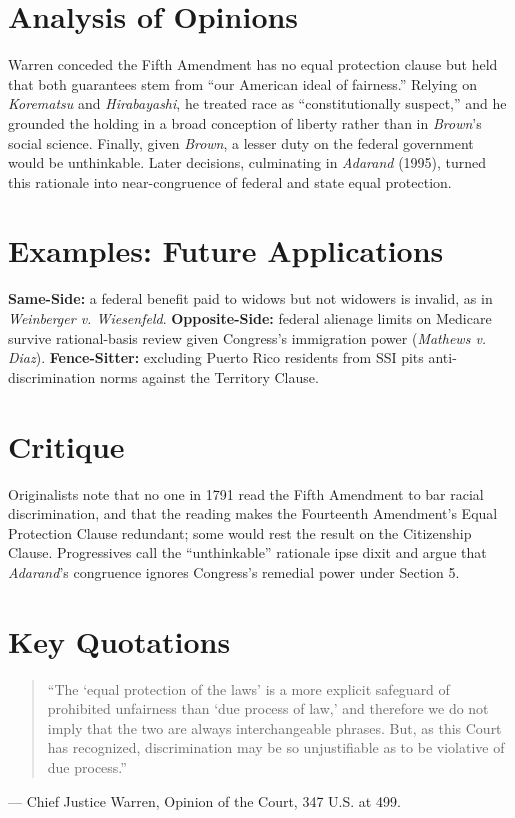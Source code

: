 \documentclass[12pt]{article}
\begin{document}
\section{Analysis of Opinions}
Warren conceded the Fifth Amendment has no equal protection clause but held that both guarantees stem from ``our American ideal of fairness.'' Relying on \textit{Korematsu} and \textit{Hi\-ra\-ba\-ya\-shi}, he treated race as ``constitutionally suspect,'' and he grounded the holding in a broad conception of liberty rather than in \textit{Brown}'s social science. Finally, given \textit{Brown}, a lesser duty on the federal government would be unthinkable. Later decisions, culminating in \textit{Adarand} (1995), turned this rationale into near-congruence of federal and state equal protection.

\section{Examples: Future Applications}
\textbf{Same-Side:} a federal benefit paid to widows but not widowers is invalid, as in \textit{Weinberger v. Wiesenfeld}. \textbf{Opposite-Side:} federal alienage limits on Medicare survive rational-basis review given Congress's immigration power (\textit{Mathews v. Diaz}). \textbf{Fence-Sitter:} excluding Puerto Rico residents from SSI pits anti-discrimination norms against the Territory Clause.

\section{Critique}
Originalists note that no one in 1791 read the Fifth Amendment to bar racial discrimination, and that the reading makes the Fourteenth Amendment's Equal Protection Clause redundant; some would rest the result on the Citizenship Clause. Progressives call the ``unthinkable'' rationale ipse dixit and argue that \textit{Adarand}'s congruence ignores Congress's remedial power under Section 5.

\section{Key Quotations}
\begin{quote}
``The `equal protection of the laws' is a more explicit safeguard of prohibited unfairness than `due process of law,' and therefore we do not imply that the two are always interchangeable phrases. But, as this Court has recognized, discrimination may be so unjustifiable as to be violative of due process.''
\end{quote}
\noindent --- Chief Justice Warren, Opinion of the Court, 347 U.S. at 499.
\end{document}

